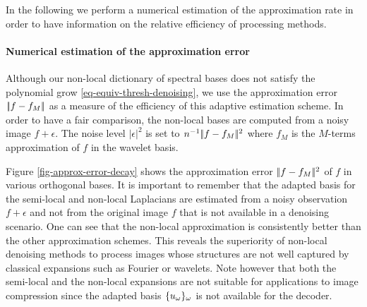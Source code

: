 \documentclass[final]{siamltex}
\newcommand{\F}{f}
\begin{document}
In the following we perform a numerical estimation of the approximation rate in order to have information on the relative efficiency of processing methods.

\paragraph{Numerical estimation of the approximation error}

Although our non-local dictionary of spectral bases does not satisfy the polynomial grow \eqref{eq-equiv-thresh-denoising}, we use the approximation error $|\!| f-f_M |\!|$ as a measure of the efficiency of this adaptive estimation scheme. In order to have a fair comparison, the non-local bases are computed from a noisy image $f+\epsilon$. The noise level $|\epsilon|^2$ is set to $n^{-1}|\!| f-f_M |\!|^2$ where $f_M$ is the $M$-terms approximation of $f$ in the wavelet basis.

Figure \ref{fig-approx-error-decay} shows the approximation error $|\!| f-f_M |\!|^2$ of $f$ in various orthogonal bases. It is important to remember that the adapted basis for the semi-local and non-local Laplacians are estimated from a noisy observation $\F+\epsilon$ and not from the original image $f$ that is not available in a denoising scenario. One can see that the non-local approximation is consistently better than the other approximation schemes. This reveals the superiority of non-local denoising methods to process images whose structures are not well captured by classical expansions such as Fourier or wavelets. Note however that both the semi-local and the non-local expansions are not suitable for applications to image compression since the adapted basis $\{u_\omega\}_\omega$ is not available for the decoder.

\end{document}
